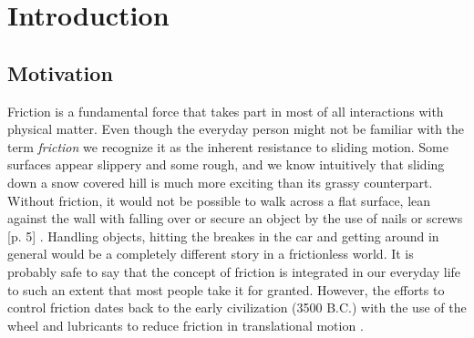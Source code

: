\chapter{Introduction}
\section{Motivation}
Friction is a fundamental force that takes part in most of all interactions with
physical matter. Even though the everyday person might not be familiar with the
term \textit{friction} we recognize it as the inherent resistance to sliding
motion. Some surfaces appear slippery and some rough, and we know intuitively
that sliding down a snow covered hill is much more exciting than its grassy
counterpart. Without friction, it would not be possible to walk across a flat
surface, lean against the wall with falling over or secure an object by the use
of nails or screws [p. 5] \cite{gnecco_meyer_2015}. Handling objects, hitting
the breakes in the car and getting around in general would be a completely
different story in a frictionless world. It is probably safe to say that the
concept of friction is integrated in our everyday life to such an extent that
most people take it for granted. However, the efforts to control friction dates
back to the early civilization (3500 B.C.) with the use of the wheel and
lubricants to reduce friction in translational motion \cite{bhushan_2013}. 

